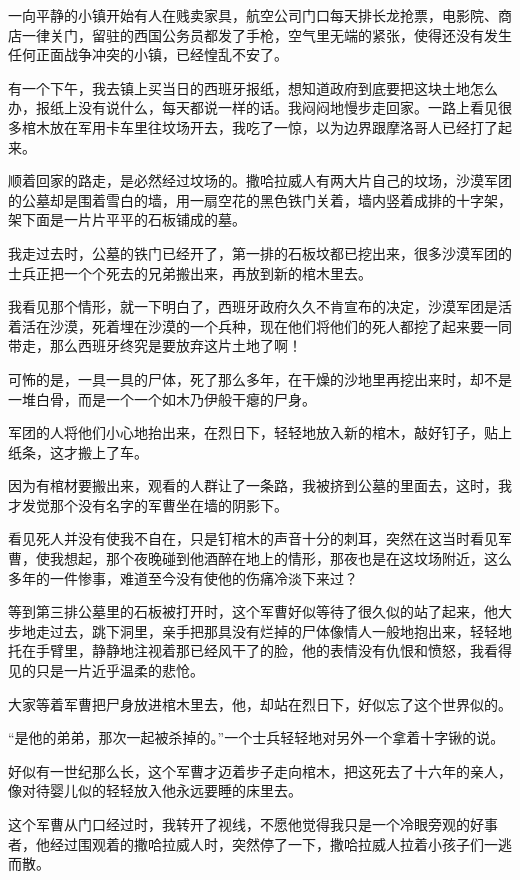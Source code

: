 \par 一向平静的小镇开始有人在贱卖家具，航空公司门口每天排长龙抢票，电影院、商店一律关门，留驻的西国公务员都发了手枪，空气里无端的紧张，使得还没有发生任何正面战争冲突的小镇，已经惶乱不安了。
\par 有一个下午，我去镇上买当日的西班牙报纸，想知道政府到底要把这块土地怎么办，报纸上没有说什么，每天都说一样的话。我闷闷地慢步走回家。一路上看见很多棺木放在军用卡车里往坟场开去，我吃了一惊，以为边界跟摩洛哥人已经打了起来。
\par 顺着回家的路走，是必然经过坟场的。撒哈拉威人有两大片自己的坟场，沙漠军团的公墓却是围着雪白的墙，用一扇空花的黑色铁门关着，墙内竖着成排的十字架，架下面是一片片平平的石板铺成的墓。
\par 我走过去时，公墓的铁门已经开了，第一排的石板坟都已挖出来，很多沙漠军团的士兵正把一个个死去的兄弟搬出来，再放到新的棺木里去。
\par 我看见那个情形，就一下明白了，西班牙政府久久不肯宣布的决定，沙漠军团是活着活在沙漠，死着埋在沙漠的一个兵种，现在他们将他们的死人都挖了起来要一同带走，那么西班牙终究是要放弃这片土地了啊！
\par 可怖的是，一具一具的尸体，死了那么多年，在干燥的沙地里再挖出来时，却不是一堆白骨，而是一个一个如木乃伊般干瘪的尸身。
\par 军团的人将他们小心地抬出来，在烈日下，轻轻地放入新的棺木，敲好钉子，贴上纸条，这才搬上了车。
\par 因为有棺材要搬出来，观看的人群让了一条路，我被挤到公墓的里面去，这时，我才发觉那个没有名字的军曹坐在墙的阴影下。
\par 看见死人并没有使我不自在，只是钉棺木的声音十分的刺耳，突然在这当时看见军曹，使我想起，那个夜晚碰到他酒醉在地上的情形，那夜也是在这坟场附近，这么多年的一件惨事，难道至今没有使他的伤痛冷淡下来过？
\par 等到第三排公墓里的石板被打开时，这个军曹好似等待了很久似的站了起来，他大步地走过去，跳下洞里，亲手把那具没有烂掉的尸体像情人一般地抱出来，轻轻地托在手臂里，静静地注视着那已经风干了的脸，他的表情没有仇恨和愤怒，我看得见的只是一片近乎温柔的悲怆。
\par 大家等着军曹把尸身放进棺木里去，他，却站在烈日下，好似忘了这个世界似的。
\par “是他的弟弟，那次一起被杀掉的。”一个士兵轻轻地对另外一个拿着十字锹的说。
\par 好似有一世纪那么长，这个军曹才迈着步子走向棺木，把这死去了十六年的亲人，像对待婴儿似的轻轻放入他永远要睡的床里去。
\par 这个军曹从门口经过时，我转开了视线，不愿他觉得我只是一个冷眼旁观的好事者，他经过围观着的撒哈拉威人时，突然停了一下，撒哈拉威人拉着小孩子们一逃而散。
